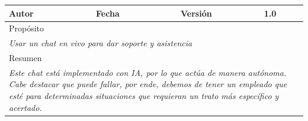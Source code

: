 \begin{table}[H]
\begin{tabular}{|llllllll|}
    \multicolumn{1}{|l|}{Autor}                                         & \multicolumn{1}{l|}{}                         & \multicolumn{2}{l|}{Fecha}             & \multicolumn{1}{l|}{}        & \multicolumn{2}{l|}{Versión}             & 1.0                            \\ \hline
    \multicolumn{8}{|l|}{Propósito}                                                                                                                                                                                                                                         \\ \hline
    \multicolumn{8}{|p{15cm}|}{{\color[HTML]{808080} \textit{Usar un chat en vivo para dar soporte y asistencia}}}                                                                                                                                                                                       \\ \hline
    \multicolumn{8}{|l|}{Resumen}                                                                                                                                                                                                                                           \\ \hline
    \multicolumn{8}{|p{15cm}|}{{\color[HTML]{808080} \textit{Este chat está implementado con IA, por lo que actúa de manera autónoma. Cabe destacar que puede fallar, por ende, debemos de tener un empleado que esté para determinadas situaciones que requieran un trato más específico y acertado.}}} \\ \hline
    \end{tabular}
    \end{table}


